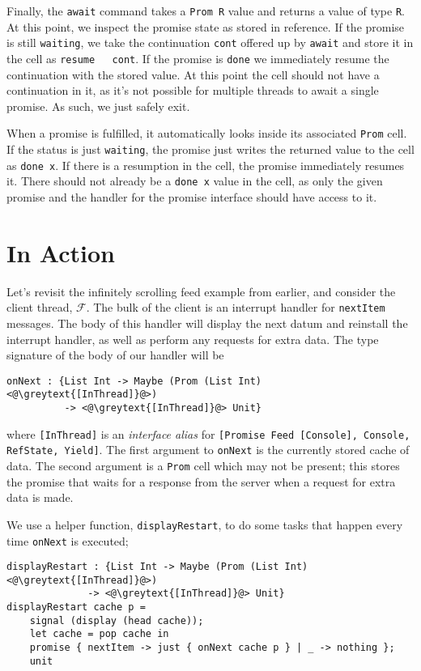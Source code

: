 \documentclass[msc,deptreport,cs]{infthesis} %
\newcommand{\code}[1]{\lstinline{#1}}
\newcommand{\greytext}[1]{\textcolor{black!40}{#1}}
\newcommand\feed{$\mathcal{F}$}
\begin{document}
Finally, the \code{await} command takes a \code{Prom R} value and returns a
value of type \code{R}. At this point, we inspect the promise state as stored in
reference. If the promise is still \code{waiting}, we take the continuation
\code{cont} offered up by \code{await} and store it in the cell as \code{resume
  cont}. If the promise is \code{done} we immediately resume the continuation
with the stored value. At this point the cell should not have a continuation in
it, as it's not possible for multiple threads to await a single promise. As
such, we just safely exit.

When a promise is fulfilled, it automatically looks inside its associated
\code{Prom} cell. If the status is just \code{waiting}, the promise just writes
the returned value to the cell as \code{done x}. If there is a resumption in the
cell, the promise immediately resumes it. There should not already be a
\code{done x} value in the cell, as only the given promise and the handler for
the promise interface should have access to it.

\section{In Action}

Let's revisit the infinitely scrolling feed example from earlier, and consider
the client thread, \feed. The bulk of the client is an interrupt handler for
\code{nextItem} messages. The body of this handler will display the next datum
and reinstall the interrupt handler, as well as perform any requests for extra data. The type signature of the body of our handler will be

\begin{lstlisting}
onNext : {List Int -> Maybe (Prom (List Int) <@\greytext{[InThread]}@>)
          -> <@\greytext{[InThread]}@> Unit}
\end{lstlisting}

\noindent where \code{[InThread]} is an \emph{interface alias} for
\code{[Promise Feed [Console], Console, RefState, Yield]}. The first argument to
\code{onNext} is the currently stored cache of data. The second argument is a
\code{Prom} cell which may not be present; this stores the promise that waits
for a response from the server when a request for extra data is made.

We use a helper function, \code{displayRestart}, to do some tasks that happen
every time \code{onNext} is executed;

\begin{lstlisting}
displayRestart : {List Int -> Maybe (Prom (List Int) <@\greytext{[InThread]}@>)
              -> <@\greytext{[InThread]}@> Unit}
displayRestart cache p =
    signal (display (head cache));
    let cache = pop cache in
    promise { nextItem -> just { onNext cache p } | _ -> nothing };
    unit
\end{lstlisting}
\end{document}
